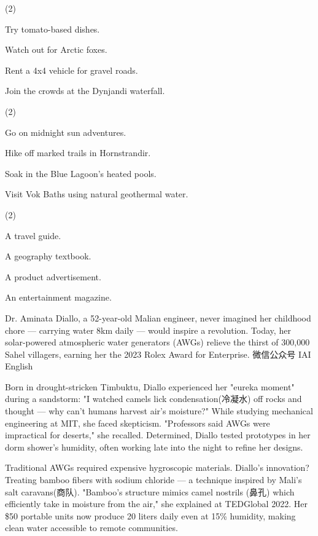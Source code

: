 \documentclass{英语试卷}
\begin{document}
\begin{choices}(2)
  \item Try tomato-based dishes.
  \item Watch out for Arctic foxes.
  \item Rent a 4x4 vehicle for gravel roads.
  \item Join the crowds at the Dynjandi waterfall.
\end{choices}
\begin{choices}(2)
  \item Go on midnight sun adventures.
  \item Hike off marked trails in Hornstrandir.
  \item Soak in the Blue Lagoon's heated pools.
  \item Visit Vok Baths using natural geothermal water.
\end{choices}
\begin{choices}(2)
  \item A travel guide.
  \item A geography textbook.
  \item A product advertisement.
  \item An entertainment magazine.
\end{choices}
\par Dr. Aminata Diallo, a 52-year-old Malian engineer, never imagined her childhood chore — carrying water 8km daily — would inspire a revolution. Today, her solar-powered atmospheric water generators (AWGs) relieve the thirst of 300,000 Sahel villagers, earning her the 2023 Rolex Award for Enterprise. 微信公众号 IAI English\par
\par Born in drought-stricken Timbuktu, Diallo experienced her "eureka moment" during a sandstorm: "I watched camels lick condensation(冷凝水) off rocks and thought — why can't humans harvest air's moisture?" While studying mechanical engineering at MIT, she faced skepticism. "Professors said AWGs were impractical for deserts," she recalled. Determined, Diallo tested prototypes in her dorm shower's humidity, often working late into the night to refine her designs.\par
\par Traditional AWGs required expensive hygroscopic materials. Diallo's innovation? Treating bamboo fibers with sodium chloride — a technique inspired by Mali's salt caravans(商队). "Bamboo’s structure mimics camel nostrils (鼻孔) which efficiently take in moisture from the air," she explained at TEDGlobal 2022. Her \$50 portable units now produce 20 liters daily even at 15\% humidity, making clean water accessible to remote communities.\par
\end{document}
